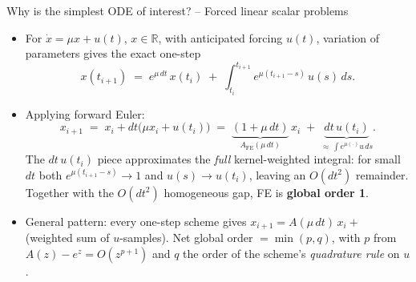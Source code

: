 \documentclass[11pt,aspectratio=169]{beamer}
\begin{document}
\begin{frame}{Why is the simplest ODE of interest? -- Forced linear scalar problems}

\begin{itemize}

\item For $\dot x = \mu x + u(t)$, $x\in\mathbb R$, with anticipated
  forcing $u(t)$, variation of parameters gives the exact one-step
  \[
  x(t_{i+1}) \;=\; e^{\mu\, dt}\, x(t_i)
  \;+\; \int_{t_i}^{t_{i+1}} e^{\mu(t_{i+1}-s)}\, u(s)\, ds.
  \]

\item Applying forward Euler:
  \[
  x_{i+1} \;=\; x_i + dt\bigl(\mu x_i + u(t_i)\bigr)
  \;=\; \underbrace{(1+\mu\, dt)}_{A_{\mathrm{FE}}(\mu\, dt)}\, x_i
  \;+\; \underbrace{dt\, u(t_i)}_{\approx\,\int e^{\mu(\cdot)}u\,ds}.
  \]
  The $dt\,u(t_i)$ piece approximates the \emph{full} kernel-weighted
  integral: for small $dt$ both $e^{\mu(t_{i+1}-s)}\to 1$ and
  $u(s)\to u(t_i)$, leaving an $O(dt^2)$ remainder. Together with the
  $O(dt^2)$ homogeneous gap, FE is \textbf{global order 1}.\newline

\item General pattern: every one-step scheme gives
  $x_{i+1} = A(\mu\,dt)\,x_i +$ (weighted sum of $u$-samples). Net
  global order $= \min(p, q)$, with $p$ from $A(z) - e^z = O(z^{p+1})$
  and $q$ the order of the scheme's \emph{quadrature rule} on $u$.

\end{itemize}

\end{frame}
\end{document}
